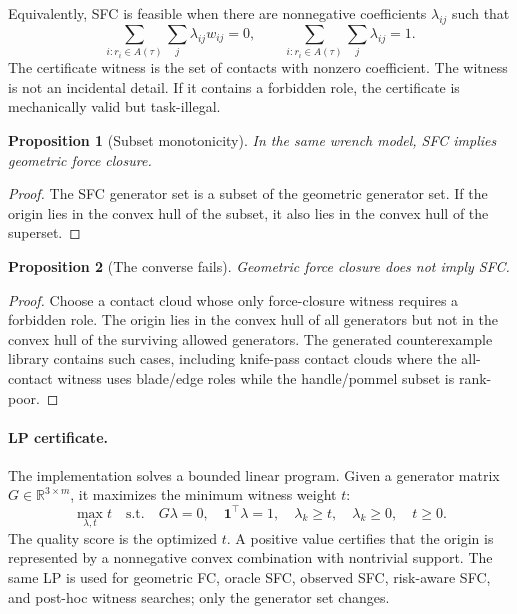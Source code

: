 \documentclass{article}
\newtheorem{proposition}{Proposition}
\begin{document}
Equivalently, SFC is feasible when there are nonnegative coefficients \(\lambda_{ij}\) such that
\[
\sum_{i:r_i\in A(\tau)} \sum_j \lambda_{ij} w_{ij}=0,
\qquad
\sum_{i:r_i\in A(\tau)} \sum_j \lambda_{ij}=1.
\]
The certificate witness is the set of contacts with nonzero coefficient. The witness is not an incidental detail. If it contains a forbidden role, the certificate is mechanically valid but task-illegal.

\begin{proposition}[Subset monotonicity]
In the same wrench model, SFC implies geometric force closure.
\end{proposition}

\begin{proof}
The SFC generator set is a subset of the geometric generator set. If the origin lies in the convex hull of the subset, it also lies in the convex hull of the superset.
\end{proof}

\begin{proposition}[The converse fails]
Geometric force closure does not imply SFC.
\end{proposition}

\begin{proof}
Choose a contact cloud whose only force-closure witness requires a forbidden role. The origin lies in the convex hull of all generators but not in the convex hull of the surviving allowed generators. The generated counterexample library contains such cases, including knife-pass contact clouds where the all-contact witness uses blade/edge roles while the handle/pommel subset is rank-poor.
\end{proof}

\paragraph{LP certificate.}
The implementation solves a bounded linear program. Given a generator matrix \(G\in\mathbb{R}^{3\times m}\), it maximizes the minimum witness weight \(t\):
\[
\max_{\lambda,t} t
\quad\text{s.t.}\quad
G\lambda=0,\quad
\mathbf{1}^{\top}\lambda=1,\quad
\lambda_k\ge t,\quad
\lambda_k\ge0,\quad t\ge0.
\]
The quality score is the optimized \(t\). A positive value certifies that the origin is represented by a nonnegative convex combination with nontrivial support. The same LP is used for geometric FC, oracle SFC, observed SFC, risk-aware SFC, and post-hoc witness searches; only the generator set changes.
\end{document}
